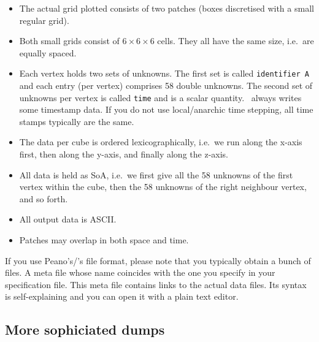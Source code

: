 \begin{itemize}
  \item The actual grid plotted consists of two patches (boxes discretised with
  a small regular grid).
  \item Both small grids consist of $6 \times 6 \times 6$ cells. They all have
  the same size, i.e.~are equally spaced. 
  \item Each vertex holds two sets of unknowns. The first set is called
  \texttt{identifier A} and each entry (per vertex) comprises 58 double
  unknowns. The second set of unknowns per vertex is called \texttt{time} and is
  a scalar quantity.
  \exahype\ always writes some timestamp data.
  If you do not use local/anarchic time stepping, all time stamps
  typically are the same.
  \item The data per cube is ordered lexicographically, i.e.~we run along the
  x-axis first, then along the y-axis, and finally along the z-axis. 
  \item All data is held as SoA, i.e.~we first give all the 58 unknowns of the
  first vertex within the cube, then the 58 unknowns of the right neighbour
  vertex, and so forth.
  \item All output data is ASCII.
  \item Patches may overlap in both space and time.
\end{itemize}


\noindent
If you use Peano's/\exahype's file format, please note that you typically obtain
a bunch of files. 
A meta file whose name coincides with the one you specify in your specification
file. 
This meta file contains links to the actual data files. 
Its syntax is self-explaining and you can open it with a plain text editor.


\subsection{More sophiciated dumps}

